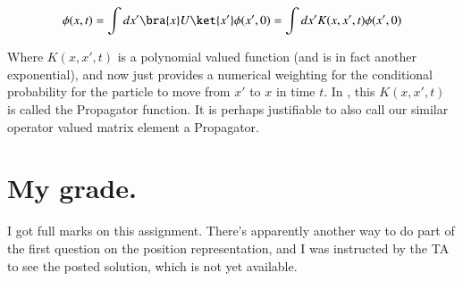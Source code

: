 \begin{align*}
\phi(x,t) = \int dx' \bra{x} U \ket{x'} \phi(x',0) = \int dx' K(x,x',t) \phi(x',0) 
\end{align*}

Where $K(x,x',t)$ is a polynomial valued function (and is in fact another exponential), and now just provides a numerical weighting for the conditional probability for the particle to move from $x'$ to $x$ in time $t$.  In \citep{liboff2003iqm}, this $K(x,x',t)$ is called the Propagator function.  It is perhaps justifiable to also call our similar operator valued matrix element a Propagator.

%
%

\section{My grade.}

I got full marks on this assignment.  There's apparently another way to do part of the first question on the position representation, and I was instructed by the TA to see the posted solution, which is not yet available.

\EndArticle
